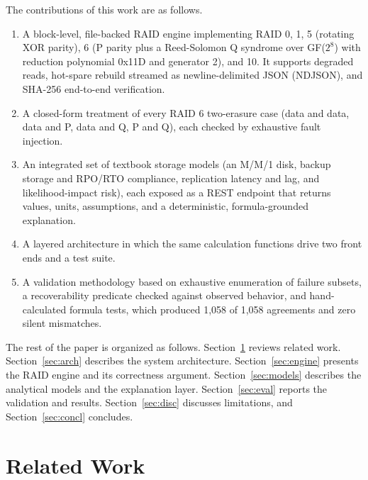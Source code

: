 \documentclass{ieeeaccess}
\begin{document}
The contributions of this work are as follows.
\begin{enumerate}
\item A block-level, file-backed RAID engine implementing RAID 0, 1, 5 (rotating XOR parity), 6 (P parity plus a Reed-Solomon Q syndrome over GF($2^8$) with reduction polynomial 0x11D and generator 2), and 10. It supports degraded reads, hot-spare rebuild streamed as newline-delimited JSON (NDJSON), and SHA-256 end-to-end verification.
\item A closed-form treatment of every RAID 6 two-erasure case (data and data, data and P, data and Q, P and Q), each checked by exhaustive fault injection.
\item An integrated set of textbook storage models (an M/M/1 disk, backup storage and RPO/RTO compliance, replication latency and lag, and likelihood-impact risk), each exposed as a REST endpoint that returns values, units, assumptions, and a deterministic, formula-grounded explanation.
\item A layered architecture in which the same calculation functions drive two front ends and a test suite.
\item A validation methodology based on exhaustive enumeration of failure subsets, a recoverability predicate checked against observed behavior, and hand-calculated formula tests, which produced 1,058 of 1,058 agreements and zero silent mismatches.
\end{enumerate}

The rest of the paper is organized as follows. Section~\ref{sec:related} reviews related work. Section~\ref{sec:arch} describes the system architecture. Section~\ref{sec:engine} presents the RAID engine and its correctness argument. Section~\ref{sec:models} describes the analytical models and the explanation layer. Section~\ref{sec:eval} reports the validation and results. Section~\ref{sec:disc} discusses limitations, and Section~\ref{sec:concl} concludes.

\section{Related Work}
\label{sec:related}

\end{document}

